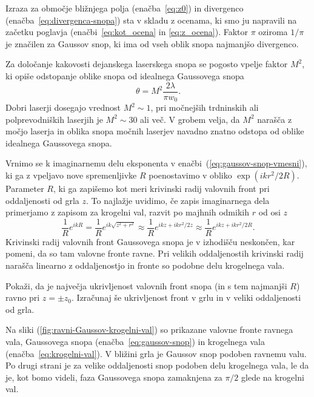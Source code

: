 Izraza za območje bližnjega polja (enačba~\ref{eq:z0}) in divergenco 
(enačba~\ref{eq:divergenca-snopa}) sta v skladu z ocenama, ki smo ju 
napravili na začetku poglavja (enačbi~\ref{eq:kot_ocena} in \ref{eq:z_ocena}). Faktor
$\pi$ oziroma $1/\pi$ je značilen za Gaussov snop, ki ima od vseh oblik snopa 
najmanjšo divergenco. 

\begin{remark}
Za določanje kakovosti dejanskega laserskega snopa se pogosto vpelje faktor $M^2$,
ki opiše odstopanje oblike snopa od idealnega Gaussovega snopa 
\begin{equation}
\theta = M^2 \frac{2\lambda}{\pi w_{0}}.
\label{faktorM}
\end{equation}
Dobri laserji dosegajo vrednost $M^2 \sim 1$,
pri močnejših trdninskih ali polprevodniških laserjih je $M^2 \sim 30$ ali več. 
V grobem velja, da $M^2$ narašča z močjo laserja in oblika snopa močnih laserjev navadno znatno
odstopa od oblike idealnega Gaussovega snopa.  
\end{remark}

Vrnimo se k imaginarnemu delu eksponenta v enačbi~(\ref{eq:gaussov-snop-vmesni}), ki ga
z vpeljavo nove spremenljivke $R$ poenostavimo v obliko $\exp(ikr^2/2R)$. Parameter $R$, ki 
ga zapišemo kot 
meri krivinski radij valovnih front 
pri oddaljenosti od grla $z$. To najlažje
uvidimo, če zapis imaginarnega dela primerjamo z zapisom za krogelni val, razvit 
po majhnih odmikih $r$ od osi
$z$
\begin{equation}
\frac{1}{R}e^{ikR}=\frac{1}{R}e^{ik\sqrt{z^{2}+r^{2}}}\approx \frac{1}{R}e^{ikz+ikr^{2}/2z} \approx \frac{1}{R}e^{ikz+ikr^{2}/2R}.
\label{eq:krogelni-val}
\end{equation}
Krivinski radij valovnih front Gaussovega snopa je v izhodišču neskončen, kar pomeni, da so tam valovne fronte 
ravne. Pri velikih oddaljenostih krivinski radij narašča linearno z oddaljenostjo in fronte
so podobne delu krogelnega vala. 

\begin{definition}
\label{naloga-ukrivljenost-snopa}
Pokaži, da je največja ukrivljenost valovnih front snopa (in s tem najmanjši $R$) ravno pri $z=\pm z_{0}$.
Izračunaj še ukrivljenost front v grlu in v veliki oddaljenosti od grla.
\end{definition}

Na sliki (\ref{fig:ravni-Gaussov-krogelni-val}) 
so prikazane valovne fronte ravnega vala, 
Gaussovega snopa (enačba~\ref{eq:gaussov-snop}) 
in krogelnega vala (enačba~\ref{eq:krogelni-val}). V bližini grla je
Gaussov snop podoben ravnemu valu. Po drugi strani je za velike oddaljenosti snop 
podoben delu krogelnega vala, le da je, kot bomo videli, faza Gaussovega snopa 
zamaknjena za $\pi/2$ glede na krogelni val. 

